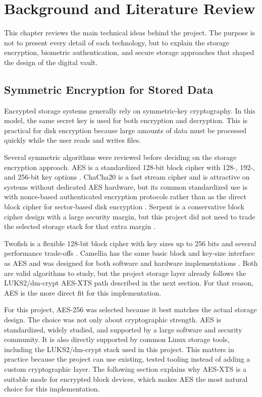 \chapter{Background and Literature Review}

This chapter reviews the main technical ideas behind the project. The purpose is not to present every detail of each technology, but to explain the storage encryption, biometric authentication, and secure storage approaches that shaped the design of the digital vault.

\section{Symmetric Encryption for Stored Data}

Encrypted storage systems generally rely on symmetric-key cryptography. In this model, the same secret key is used for both encryption and decryption. This is practical for disk encryption because large amounts of data must be processed quickly while the user reads and writes files.

Several symmetric algorithms were reviewed before deciding on the storage encryption approach. AES is a standardized 128-bit block cipher with 128-, 192-, and 256-bit key options \cite{nistFips197}. ChaCha20 is a fast stream cipher and is attractive on systems without dedicated AES hardware, but its common standardized use is with nonce-based authenticated encryption protocols rather than as the direct block cipher for sector-based disk encryption \cite{rfc8439ChaCha20}. Serpent is a conservative block cipher design with a large security margin, but this project did not need to trade the selected storage stack for that extra margin \cite{andersonSerpent}.

Twofish is a flexible 128-bit block cipher with key sizes up to 256 bits and several performance trade-offs \cite{schneierTwofish}. Camellia has the same basic block and key-size interface as AES and was designed for both software and hardware implementations \cite{rfc3713Camellia}. Both are valid algorithms to study, but the project storage layer already follows the LUKS2/dm-crypt AES-XTS path described in the next section. For that reason, AES is the more direct fit for this implementation.

For this project, AES-256 was selected because it best matches the actual storage design. The choice was not only about cryptographic strength. AES is standardized, widely studied, and supported by a large software and security community. It is also directly supported by common Linux storage tools, including the LUKS2/dm-crypt stack used in this project. This matters in practice because the project can use existing, tested tooling instead of adding a custom cryptographic layer. The following section explains why AES-XTS is a suitable mode for encrypted block devices, which makes AES the most natural choice for this implementation.

